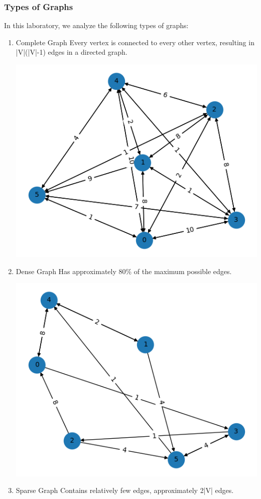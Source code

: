 \documentclass[a4paper,12pt]{article}
\begin{document}
\subsubsection{Types of Graphs}
\label{sec:org206922d}
In this laboratory, we analyze the following types of graphs:
\begin{enumerate}
\item Complete Graph
\label{sec:orgfa71e67}
Every vertex is connected to every other vertex, resulting in |V|(|V|-1) edges in a directed graph.

\begin{center}
\includegraphics[width=.9\linewidth]{example_complete.png}
\label{orgf6f0dc1}
\end{center}
\item Dense Graph
\label{sec:orgdeed191}
Has approximately 80\% of the maximum possible edges.

\begin{center}
\includegraphics[width=.9\linewidth]{example_dense.png}
\label{orge2339cb}
\end{center}
\item Sparse Graph
\label{sec:orgf424fe7}
Contains relatively few edges, approximately 2|V| edges.


\end{enumerate}
\end{document}
